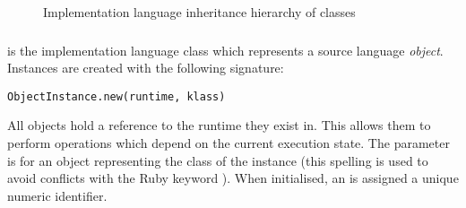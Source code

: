 \begin{figure}
\begin{center}
\caption{Implementation language inheritance hierarchy of  classes}
\label{fig:data_object_hierarchy}
\end{center}
\end{figure}

\subsubsection{}

 is the implementation language class which represents a source language \textit{object}. Instances are created with the following signature:

\begin{lstlisting}
ObjectInstance.new(runtime, klass)
\end{lstlisting}

All  objects hold a reference to the runtime they exist in. This allows them to perform operations which depend on the current execution state. The  parameter is for an object representing the class of the instance (this spelling is used to avoid conflicts with the Ruby keyword ). When initialised, an  is assigned a unique numeric identifier.

